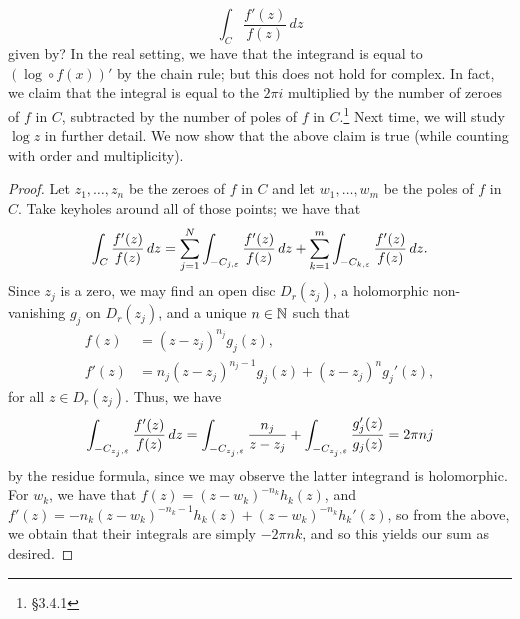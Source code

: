 \[ \int_{C} \frac{f'(z)}{f(z)} \, dz \]
given by? In the real setting, we have that the integrand is equal to $(\log \circ f(x))'$ by the chain rule; but this does not hold for complex. In fact, we claim that the integral is equal to the $2\pi i$ multiplied by the number of zeroes of $f$ in $C$, subtracted by the number of poles of $f$ in $C$.\footnote{\S 3.4.1} Next time, we will study $\log z$ in further detail. We now show that the above claim is true (while counting with order and multiplicity).
\begin{proof}
    Let $z_1, \dots, z_n$ be the zeroes of $f$ in $C$ and let $w_1, \dots, w_m$ be the poles of $f$ in $C$. Take keyholes around all of those points; we have that
    \[ \int_C \frac{f'(z)}{f(z)} \, dz = \sum_{j=1}^N \int_{-C_{j,\varepsilon}} \frac{f'(z)}{f(z)} \, dz + \sum_{k=1}^m \int_{-C_{k,\varepsilon}} \frac{f'(z)}{f(z)} \, dz. \]
    Since $z_j$ is a zero, we may find an open disc $D_r(z_j)$, a holomorphic non-vanishing $g_j$ on $D_r(z_j)$, and a unique $n \in \mathbb N$ such that
    \begin{align*}
        f(z) &= (z - z_j)^{n_j} g_j(z), \\
        f'(z) &= n_j (z - z_j)^{n_j - 1} g_j(z) + (z - z_j)^n g_j'(z),
    \end{align*}
    for all $z \in D_r(z_j)$. Thus, we have
    \[ \int_{-C_{z_j,\varepsilon}} \frac{f'(z)}{f(z)} \, dz = \int_{-C_{z_j, \varepsilon}} \frac{n_j}{z - z_j} + \int_{-C_{z_j,\varepsilon}} \frac{g_j'(z)}{g_j(z)} = 2\pi n j \]
    by the residue formula, since we may observe the latter integrand is holomorphic. For $w_k$, we have that $f(z) = (z - w_k)^{-n_k} h_k(z)$, and $f'(z) = -n_k(z - w_k)^{-n_k - 1} h_k(z) + (z - w_k)^{-n_k} h_k'(z)$, so from the above, we obtain that their integrals are simply $-2\pi n k$, and so this yields our sum as desired.
\end{proof}